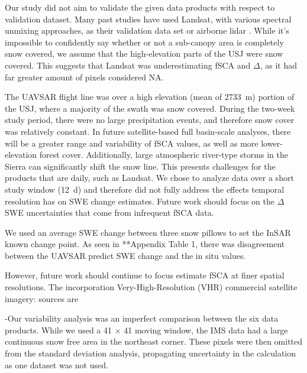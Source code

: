 Our study did not aim to validate the given data products with respect to validation dataset. Many past studies have used Landsat, with various spectral unmixing approaches, as their validation data set \citep{painterRetrievalSubpixelSnow2009,rittgerAssessmentMethodsMapping2013 } or airborne lidar \citep{stillingerLandsatMODISVIIRS2023a}. While it's impossible to confidently say whether or not a sub-canopy area is completely snow covered, we assume that the high-elevation parts of the USJ were snow covered. This suggests that Landsat was underestimating fSCA and $\Delta$, as it had far greater amount of pixels considered NA.

The UAVSAR flight line was over a high elevation (mean of 2733~m) portion of the USJ, where a majority of the swath was snow covered. During the two-week study period, there were no large precipitation events, and therefore snow cover was relatively constant. In future satellite-based full basin-scale analyses, there will be a greater range and variability of fSCA values, as well as more lower-elevation forest cover. Additionally, large atmospheric river-type storms in the Sierra can significantly shift the snow line. This presents challenges for the products that are daily, such as Landsat. We chose to analyze data over a short study window (12~d) and therefore did not fully address the effects temporal resolution has on SWE change estimates. Future work should focus on the $\Delta$SWE uncertainties that come from infrequent fSCA data.

We used an average SWE change between three snow pillows to set the InSAR known change point. As seen in **Appendix Table 1, there was disagreement between the UAVSAR predict SWE change and the in situ values. 


However, future work should continue to focus estimate fSCA at finer spatial resolutions. The incorporation Very-High-Resolution (VHR) commercial satellite imagery: sources are \citep{huImprovingMountainSnow2022, thalerEstimatingSnowCover2023,yangHighresolutionMappingSnow2023,johnHighResolutionSnowCoveredArea2022}


-Our variability analysis was an imperfect comparison between the six data products. While we used a 41 $\times$ 41 moving window, the IMS data had a large continuous snow free area in the northeast corner. These pixels were then omitted from the standard deviation analysis, propagating uncertainty in the calculation as one dataset was not used.

